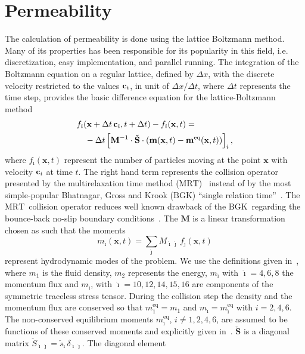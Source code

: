 \documentclass[aps,twocolumn,superscriptaddress,showpacs,showkeys]{revtex4-1}
\newcommand{\ii}{{\dot{\imath}}}
\newcommand{\jj}{{\dot{\jmath}}}
\renewcommand{\c}{{\bf c}}
\newcommand{\ci}{\c_{\ii}}
\newcommand{\vbf}[1]{\mathbf{#1}}
\newcommand{\dt}{\Delta t}
\newcommand{\dx}{\Delta x}
\newcommand{\x}{\vbf{x}}
\newcommand{\f}{f}
\newcommand{\fii}{\f_{\ii}}
\newcommand{\BGK}{\ensuremath{\text{BGK}}}
\newcommand{\MRT}{\ensuremath{\text{MRT}}}
\newcommand{\m}{m}
\newcommand{\mi}{\m_{\ii}}
\newcommand{\bfm}{\vbf{\m}}
\newcommand{\mq}{\m^{\mathrm{eq}}}
\newcommand{\mqi}{\m^{\mathrm{eq}}_{\ii}}
\newcommand{\bfmq}{{\bfm}^{\mathrm{eq}}}
\newcommand{\bfM}{\vbf{M}}
\newcommand{\bfhS}{\vbf{\check{S}}}
\newcommand{\hS}{\check{S}}
\begin{document}
\section{Permeability}
\label{sec:permeability}
The calculation of permeability is done using the lattice Boltzmann
method. Many of its properties has been responsible for its popularity in this
field, i.e. discretization, easy implementation, and parallel running. The
integration of the Boltzmann equation on a regular lattice, defined by $\dx$,
with the discrete velocity restricted to the values $\ci$, in unit of
$\dx/\dt$, where $\dt$ represents the time step, provides the basic difference
equation for the lattice-Boltzmann method
%
\begin{equation}
\label{LB:MRT:eq}
\begin{split}
& \fii(\x+\dt\,\ci,t+\dt)  - \fii(\x,t) = \\
& \quad -\dt \left[{\bfM}^{-1} \cdot \bfhS \cdot \left( \bfm(\x,t) -
 \bfmq(\x,t) \right) \right]_{\ii},
\end{split}
\end{equation}
%
where $\fii(\x,t)$ represent the number of particles moving at the point $\x$
with velocity $\ci$ at time $t$. The right hand term represents the collision
operator presented by the multirelaxation time method
(\MRT)~\cite{2002RSPTA.360..437D} instead of by the most simple-popular
Bhatnagar, Gross and Krook (\BGK) ``single relation
time''~\cite{bib:chen-chen-martinez-matthaeus,bib:bgk}.  The \MRT\ collision
operator reduces well known drawback of the \BGK\ regarding the bounce-back
no-slip boundary conditions~\cite{bib:cf.CPaLLuCMi.2006,NZRHH10}. The $\bfM$
is a linear transformation chosen as such that the moments
%
\begin{equation}
\mi (\x,t)=\sum_{\jj} M_{\ii\,\jj} \, \f_{\jj}(\x,t)
\end{equation}
%       
represent hydrodynamic modes of the problem. We use the definitions given
in~\cite{2002RSPTA.360..437D}, where $\m_{1}$ is the fluid density, $\m_{2}$
represents the energy, $\mi$ with $\ii=4,6,8$ the momentum flux and $\mi$,
with $\ii=10,12,14,15,16$ are components of the symmetric traceless stress
tensor.  During the collision step the density and the momentum flux are
conserved so that $\mq_{1}=\m_{1}$ and $\mi=\mqi$ with $i=2,4,6$. The
non-conserved equilibrium moments $\mqi$, $i\neq 1,2,4,6$, are assumed to be
functions of these conserved moments and explicitly given
in~\cite{2002RSPTA.360..437D}. 
$\bfhS$ is a diagonal matrix $\hS_{\ii\,\jj} =
\check{s}_{\ii} \, \delta_{\ii\,\jj}$. The diagonal element
\end{document}
